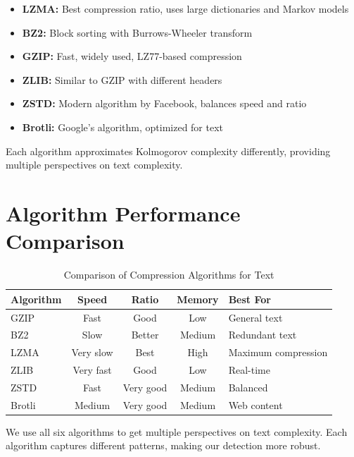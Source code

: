 \documentclass[12pt,a4paper]{report}
\begin{document}
\begin{itemize}
    \item \textbf{LZMA:} Best compression ratio, uses large dictionaries and Markov models
    \item \textbf{BZ2:} Block sorting with Burrows-Wheeler transform
    \item \textbf{GZIP:} Fast, widely used, LZ77-based compression
    \item \textbf{ZLIB:} Similar to GZIP with different headers
    \item \textbf{ZSTD:} Modern algorithm by Facebook, balances speed and ratio
    \item \textbf{Brotli:} Google's algorithm, optimized for text
\end{itemize}

Each algorithm approximates Kolmogorov complexity differently, providing multiple perspectives on text complexity.

\section{Algorithm Performance Comparison}

\begin{table}[h]
\centering
\caption{Comparison of Compression Algorithms for Text}
\begin{tabular}{lcccl}
\toprule
\textbf{Algorithm} & \textbf{Speed} & \textbf{Ratio} & \textbf{Memory} & \textbf{Best For} \\
\midrule
GZIP & Fast & Good & Low & General text \\
BZ2 & Slow & Better & Medium & Redundant text \\
LZMA & Very slow & Best & High & Maximum compression \\
ZLIB & Very fast & Good & Low & Real-time \\
ZSTD & Fast & Very good & Medium & Balanced \\
Brotli & Medium & Very good & Medium & Web content \\
\bottomrule
\end{tabular}
\end{table}

We use all six algorithms to get multiple perspectives on text complexity. Each algorithm captures different patterns, making our detection more robust.
\end{document}

